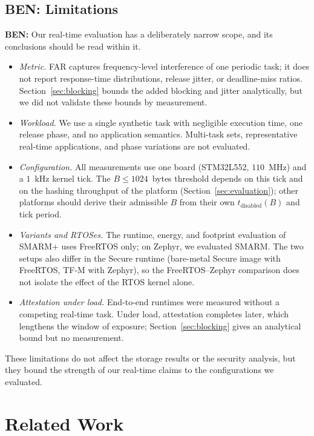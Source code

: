 \documentclass{ieeeaccess}
\DeclareRobustCommand{\ben}[1]{{\color{BENcolor}\textbf{BEN:} #1}}
\newcommand{\rtsmarm}{SMARM+\xspace}
\begin{document}
\subsection{\ben{Limitations}}
\label{sec:limitations}
\ben{Our real-time evaluation has a deliberately narrow scope, and its conclusions should be read within it.
\begin{itemize}
  \item \emph{Metric.} FAR captures frequency-level interference of one periodic task; it does not report response-time distributions, release jitter, or deadline-miss ratios. Section~\ref{sec:blocking} bounds the added blocking and jitter analytically, but we did not validate these bounds by measurement.
  \item \emph{Workload.} We use a single synthetic task with negligible execution time, one release phase, and no application semantics. Multi-task sets, representative real-time applications, and phase variations are not evaluated.
  \item \emph{Configuration.} All measurements use one board (STM32L552, $110$~MHz) and a $1$~kHz kernel tick. The $B \le 1024$~bytes threshold depends on this tick and on the hashing throughput of the platform (Section~\ref{sec:evaluation}); other platforms should derive their admissible $B$ from their own $t_{\text{disabled}}(B)$ and tick period.
  \item \emph{Variants and RTOSes.} The runtime, energy, and footprint evaluation of \rtsmarm uses FreeRTOS only; on Zephyr, we evaluated SMARM. The two setups also differ in the Secure runtime (bare-metal Secure image with FreeRTOS, TF-M with Zephyr), so the FreeRTOS--Zephyr comparison does not isolate the effect of the RTOS kernel alone.
  \item \emph{Attestation under load.} End-to-end runtimes were measured without a competing real-time task. Under load, attestation completes later, which lengthens the window of exposure; Section~\ref{sec:blocking} gives an analytical bound but no measurement.
\end{itemize}
These limitations do not affect the storage results or the security analysis, but they bound the strength of our real-time claims to the configurations we evaluated.}

\section{Related Work}
\label{sec:related}
\end{document}
